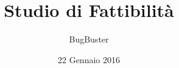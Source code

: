 



\title{\textbf{Studio di Fattibilit\`a}}
\author{BugBuster}

\date{22 Gennaio 2016}




\makeFrontPage

\tableofcontents





